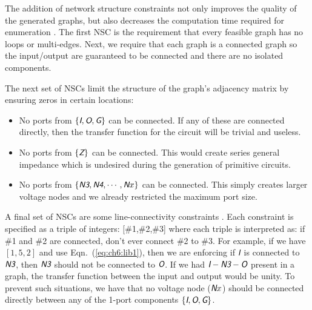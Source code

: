 The addition of network structure constraints not only improves the quality of the generated graphs, but also decreases the computation time required for enumeration \cite{Herber2017a, Herber2017d}.
The first NSC is the requirement that every feasible graph has no loops or multi-edges. Next, we require that each graph is a connected graph so the input/output are guaranteed to be connected and there are no isolated components.

The next set of NSCs limit the structure of the graph's adjacency matrix by ensuring zeros in certain locations:
\begin{itemize}
\item No ports from $\{ \textsl{\textsf{I}}, \textsl{\textsf{O}}, \textsl{\textsf{G}} \}$ can be connected. If any of these are connected directly, then the transfer function for the circuit will be trivial and useless.

\item No ports from $\{ \textsl{\textsf{Z}} \}$ can be connected. This would create series general impedance which is undesired during the generation of primitive circuits.

\item No ports from $\{ \textsl{\textsf{N3}}, \textsl{\textsf{N4}}, \cdots, \textsl{\textsf{N}}x \}$ can be connected. This simply creates larger voltage nodes and we already restricted the maximum port size.
\end{itemize}

A final set of NSCs are some line-connectivity constraints \cite{Herber2017d}. Each constraint is specified as a triple of integers: [\#1,\#2,\#3] where each triple is interpreted as: if \#1 and \#2 are connected, don't ever connect \#2 to \#3.
For example, if we have $[1,5,2]$ and use Eqn.~(\ref{eq:ch6:lib1}), then we are enforcing if $\textsl{\textsf{I}}$ is connected to $\textsl{\textsf{N3}}$, then $\textsl{\textsf{N3}}$ should not be connected to $\textsl{\textsf{O}}$.
If we had $\textsl{\textsf{I}} - \textsl{\textsf{N3}} - \textsl{\textsf{O}}$ present in a graph, the transfer function between the input and output would be unity.
To prevent such situations, we have that no voltage node ($\textsl{\textsf{N}}x$) should be connected directly between any of the 1-port components $\{\textsl{\textsf{I}}, \textsl{\textsf{O}}, \textsl{\textsf{G}} \}$.

